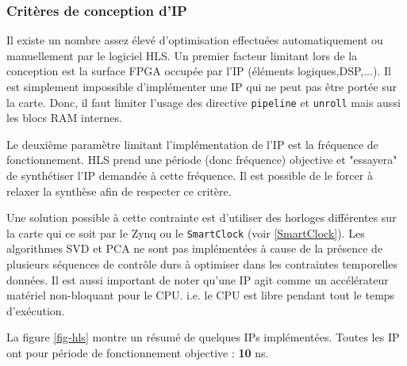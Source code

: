 \documentclass[12pt,a4paper]{article}
\begin{document}
\subsubsection{Critères de conception d'IP}
Il existe un nombre assez élevé d'optimisation effectuées automatiquement ou manuellement par le logiciel HLS. Un premier facteur limitant lors de la conception est la surface FPGA occupée par l'IP (éléments logiques,DSP,...). Il est simplement impossible d'implémenter une IP qui ne peut pas être portée sur la carte. Donc, il faut limiter l'usage des directive \texttt{pipeline} et \texttt{unroll} mais aussi les blocs RAM internes.

Le deuxième paramètre limitant l'implémentation de l'IP est la fréquence de fonctionnement. HLS prend une période (donc fréquence) objective et "essayera" de synthétiser l'IP demandée à cette fréquence. Il est possible de le forcer à relaxer la synthèse afin de respecter ce critère.

Une solution possible à cette contrainte est d'utiliser des horloges différentes sur la carte qui ce soit par le Zynq ou le \texttt{SmartClock} (voir \ref{SmartClock}). Les algorithmes SVD et PCA ne sont pas implémentées à cause de la présence de plusieurs séquences de contrôle durs à optimiser dans les contraintes temporelles données. Il est aussi important de noter qu'une IP agit comme un accélérateur matériel non-bloquant pour le CPU. i.e. le CPU est libre pendant tout le temps d'exécution.

La figure \ref{fig-hls} montre un résumé de quelques IPs implémentées. Toutes les IP ont pour période de fonctionnement objective : \textbf{10} ns.
\end{document}
